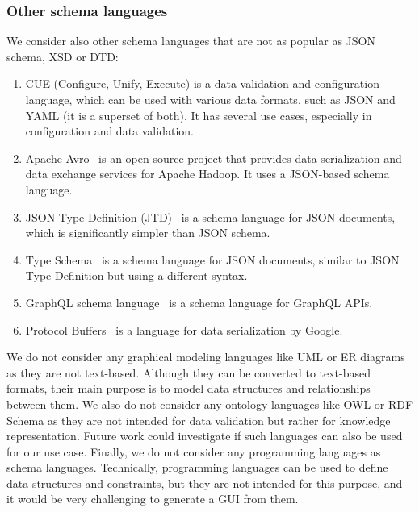 \subsubsection{Other schema languages} %
We consider also other schema languages that are not as popular as JSON schema, XSD or DTD\@:
\begin{enumerate}[label=(\alph*)]
    \item CUE (Configure, Unify, Execute)\cite{cuelang} is a data validation and configuration language, which can be used with various data formats, such as JSON and YAML (it is a superset of both).
    It has several use cases, especially in configuration and data validation.
    \item Apache Avro~\cite{Apache-Avro} is an open source project that provides data serialization and data exchange services for Apache Hadoop.
    It uses a JSON-based schema language.
    \item JSON Type Definition (JTD)~\cite{rfc8927} is a schema language for JSON documents, which is significantly simpler than JSON schema.
    \item Type Schema~\cite{Kappestein_2023} is a schema language for JSON documents, similar to JSON Type Definition but using a different syntax.
    \item GraphQL schema language~\cite{graphQL} is a schema language for GraphQL APIs.
    \item Protocol Buffers~\cite{protobufProtocolBuffers} is a language for data serialization by Google.
\end{enumerate}

We do not consider any graphical modeling languages like UML or ER diagrams as they are not text-based.
Although they can be converted to text-based formats, their main purpose is to model data structures and relationships between them.
We also do not consider any ontology languages like OWL or RDF Schema as they are not intended for data validation but rather for knowledge representation.
Future work could investigate if such languages can also be used for our use case.
Finally, we do not consider any programming languages as schema languages.
Technically, programming languages can be used to define data structures and constraints, but they are not intended for this purpose, and it would be very challenging to generate a GUI from them.


%

